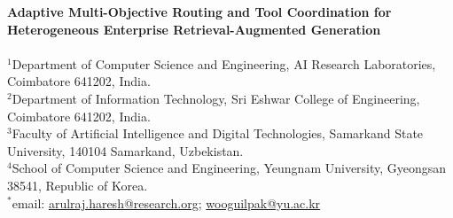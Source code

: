 \documentclass[fleqn,10pt]{article}
\begin{document}
{\LARGE\textbf{\textsf{Adaptive Multi-Objective Routing and Tool Coordination for Heterogeneous Enterprise Retrieval-Augmented Generation}}}\\[1.2em]

\\[0.8em]

\noindent\footnotesize\textsf{
$^1$Department of Computer Science and Engineering, AI Research Laboratories, Coimbatore 641202, India.\\
$^2$Department of Information Technology, Sri Eshwar College of Engineering, Coimbatore 641202, India.\\
$^3$Faculty of Artificial Intelligence and Digital Technologies, Samarkand State University, 140104 Samarkand, Uzbekistan.\\
$^4$School of Computer Science and Engineering, Yeungnam University, Gyeongsan 38541, Republic of Korea.\\
$^*$email: \href{mailto:arulraj.haresh@research.org}{arulraj.haresh@research.org}; \href{mailto:wooguilpak@yu.ac.kr}{wooguilpak@yu.ac.kr}
}

\vspace{1.5em}
\end{document}
